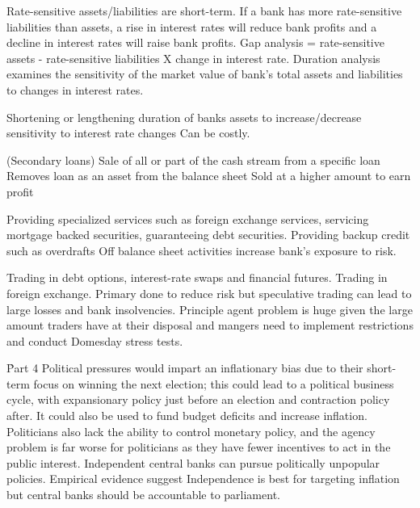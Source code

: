 \documentclass[12pt]{examnotes}
\begin{document}
\ra Rate-sensitive assets/liabilities are short-term.
\ra If a bank has more rate-sensitive liabilities than assets, a rise in interest rates will reduce bank profits and a decline in interest rates will raise bank profits.
\ra Gap analysis = rate-sensitive assets - rate-sensitive liabilities X change in interest rate. 
\ra Duration analysis examines the sensitivity of the market value of bank's total assets and liabilities to changes in interest rates.

\ra Shortening or lengthening duration of banks assets to increase/decrease sensitivity to interest rate changes
\ra Can be costly.

 (Secondary loans)
\ra Sale of all or part of the cash stream from a specific loan
\ra Removes loan as an asset from the balance sheet
\ra Sold at a higher amount to earn profit

\ra Providing specialized services such as  foreign exchange services, servicing mortgage backed securities, guaranteeing debt securities.
\ra Providing backup credit such as overdrafts
\ra Off balance sheet activities increase bank's exposure to risk.

\ra Trading in debt options, interest-rate swaps and financial futures.
\ra Trading in foreign exchange.
\ra Primary done to reduce risk but speculative trading can lead to large losses and bank insolvencies.
\ra Principle agent problem is huge given the large amount traders have at their disposal and mangers need to implement restrictions and conduct Domesday stress tests.

\h{Part 4}
\ra Political pressures would impart an inflationary bias due to their short-term focus on winning the next election; this could lead to a political business cycle, with expansionary policy just before an election and contraction policy after.
\ra It could also be used to fund budget deficits and increase inflation.
\ra Politicians also lack the ability to control monetary policy, and the agency problem is far worse for politicians as they have fewer incentives to act in the public interest.
\ra Independent central banks can pursue politically unpopular policies.
\ra Empirical evidence suggest Independence is best for targeting inflation but central banks should be accountable to parliament.
\end{document}
